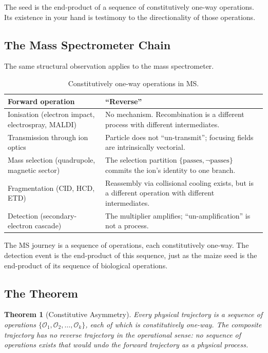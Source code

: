 \documentclass[twocolumn,10pt,a4paper]{article}
\newtheorem{theorem}{Theorem}[section]
\theoremstyle{definition}
\theoremstyle{remark}
\newcommand{\Operation}{\mathcal{O}}
\begin{document}
The seed is the end-product of a sequence of constitutively one-way operations. Its existence in your hand is testimony to the directionality of those operations.

\subsection{The Mass Spectrometer Chain}

The same structural observation applies to the mass spectrometer.

\begin{table}[H]
\centering
\caption{Constitutively one-way operations in MS.}
\label{tab:ms-operations}
\begin{tabular}{p{}p{}}
\toprule
\textbf{Forward operation} & \textbf{``Reverse''} \\
\midrule
Ionisation (electron impact, electrospray, MALDI) & No mechanism. Recombination is a different process with different intermediates. \\
\addlinespace
Transmission through ion optics & Particle does not ``un-transmit''; focusing fields are intrinsically vectorial. \\
\addlinespace
Mass selection (quadrupole, magnetic sector) & The selection partition $\{\text{passes}, \neg\text{passes}\}$ commits the ion's identity to one branch. \\
\addlinespace
Fragmentation (CID, HCD, ETD) & Reassembly via collisional cooling exists, but is a different operation with different intermediates. \\
\addlinespace
Detection (secondary-electron cascade) & The multiplier amplifies; ``un-amplification'' is not a process. \\
\bottomrule
\end{tabular}
\end{table}

The MS journey is a sequence of operations, each constitutively one-way. The detection event is the end-product of this sequence, just as the maize seed is the end-product of its sequence of biological operations.

\subsection{The Theorem}

\begin{theorem}[Constitutive Asymmetry]
\label{thm:constitutive}
Every physical trajectory is a sequence of operations $\{\Operation_1, \Operation_2, \ldots, \Operation_k\}$, each of which is constitutively one-way. The composite trajectory has no reverse trajectory in the operational sense: no sequence of operations exists that would undo the forward trajectory as a physical process.
\end{theorem}
\end{document}
